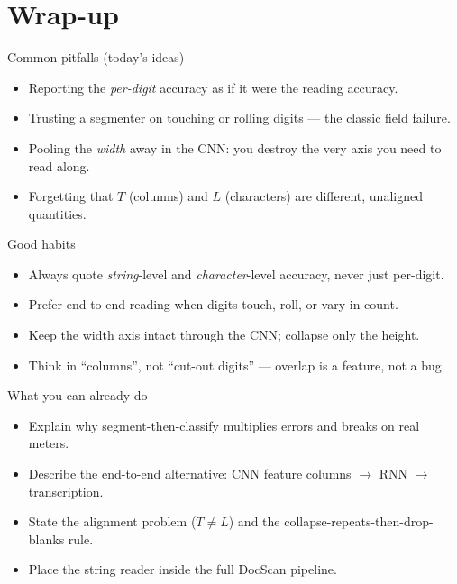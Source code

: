 \documentclass[10pt,aspectratio=169]{beamer}
\begin{document}
\section{Wrap-up}

\begin{frame}{Common pitfalls (today's ideas)}
  \begin{badbox}
    \begin{itemize}
      \item Reporting the \emph{per-digit} accuracy as if it were the reading accuracy.
      \item Trusting a segmenter on touching or rolling digits --- the classic field failure.
      \item Pooling the \emph{width} away in the CNN: you destroy the very axis you need to read along.
      \item Forgetting that $T$ (columns) and $L$ (characters) are different, unaligned quantities.
    \end{itemize}
  \end{badbox}
\end{frame}

\begin{frame}{Good habits}
  \begin{goodbox}
    \begin{itemize}
      \item Always quote \emph{string}-level and \emph{character}-level accuracy, never just per-digit.
      \item Prefer end-to-end reading when digits touch, roll, or vary in count.
      \item Keep the width axis intact through the CNN; collapse only the height.
      \item Think in ``columns'', not ``cut-out digits'' --- overlap is a feature, not a bug.
    \end{itemize}
  \end{goodbox}
\end{frame}

\begin{frame}{What you can already do}
  \begin{itemize}
    \item Explain why segment-then-classify multiplies errors and breaks on real meters.
    \item Describe the end-to-end alternative: CNN feature columns $\rightarrow$ RNN $\rightarrow$ transcription.
    \item State the alignment problem ($T \neq L$) and the collapse-repeats-then-drop-blanks rule.
    \item Place the string reader inside the full DocScan pipeline.
  \end{itemize}
\end{frame}
\end{document}
